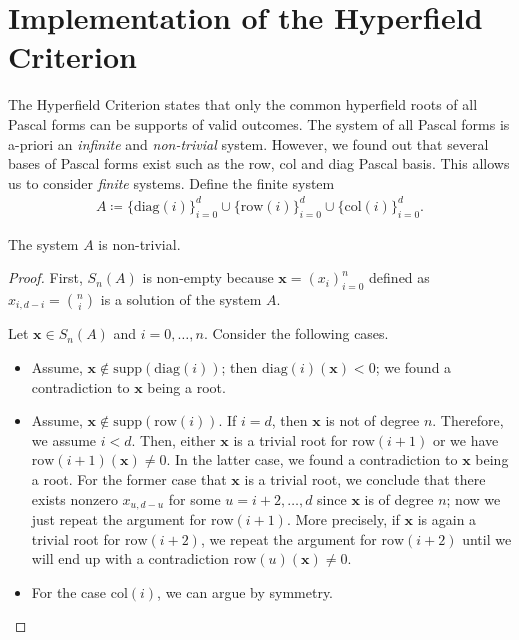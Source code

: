 \section{Implementation of the Hyperfield Criterion}

The Hyperfield Criterion states that only the common hyperfield roots of all Pascal forms can be supports of valid outcomes. The system of all Pascal forms is a-priori an \emph{infinite} and \emph{non-trivial} system. However, we found out that several bases of Pascal forms exist such as the row, col and diag Pascal basis. This allows us to consider \emph{finite} systems. Define the finite system
\begin{align*}
    A \coloneqq \{ \mathrm{diag}(i) \}_{i=0}^d \cup \{ \mathrm{row}(i)\}^d_{i=0} \cup \{ \mathrm{col}(i) \}^d_{i=0}.
\end{align*}

\begin{proposition}
The system $A$ is non-trivial.
\end{proposition}

\begin{proof}
First, $S_{n}(A)$ is non-empty because $\mathbf{x} = (x_{i})_{i=0}^n$ defined as $x_{i, d-i} = {n \choose i}$ is a solution of the system $A$. 

Let $\mathbf{x} \in S_{n}(A)$ and $i = 0, \dots, n$. Consider the following cases.
\begin{itemize}
    \item Assume, $\mathbf{x} \notin \mathrm{supp}(\mathrm{diag}(i))$; then $\mathrm{diag}(i)(\mathbf{x}) < 0$; we found a contradiction to $\mathbf{x}$ being a root. 
    \item Assume, $\mathbf{x} \notin \mathrm{supp}(\mathrm{row}(i))$. If $i = d$, then $\mathbf{x}$ is not of degree $n$. Therefore, we assume $i < d$. Then, either $\mathbf{x}$ is a trivial root for $\mathrm{row}(i+1)$ or we have $\mathrm{row}(i+1)(\mathbf{x}) \neq 0$. In the latter case, we found a contradiction to $\mathbf{x}$ being a root. For the former case that $\mathbf{x}$ is a trivial root, we conclude that there exists nonzero $x_{u, d-u}$ for some $u = i+2, \dots, d$ since $\mathbf{x}$ is of degree $n$; now we just repeat the argument for $\mathrm{row}(i+1)$. More precisely, if $\mathbf{x}$ is again a trivial root for $\mathrm{row}(i+2)$, we repeat the argument for $\mathrm{row}(i+2)$ until we will end up with a contradiction $\mathrm{row}(u)(\mathbf{x}) \neq 0$.
    \item For the case $\mathrm{col}(i)$, we can argue by symmetry.
\end{itemize}
\end{proof}

